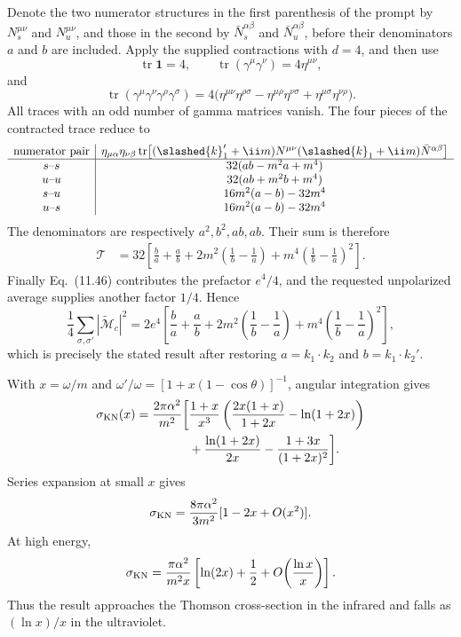 \begin{enumerate}
Denote the two numerator structures in the first parenthesis of the prompt
by \(N_s^{\mu\nu}\) and \(N_u^{\mu\nu}\), and those in the second by
\(\bar N_s^{\alpha\beta}\) and \(\bar N_u^{\alpha\beta}\), before their
denominators \(a\) and \(b\) are included.  Apply the supplied contractions
with \(d=4\), and then use
\[
 \operatorname{tr}\mathbf1=4,
 \qquad
 \operatorname{tr}(\gamma^\mu\gamma^\nu)=4\eta^{\mu\nu},
\]
and
\[
 \operatorname{tr}(\gamma^\mu\gamma^\nu\gamma^\rho\gamma^\sigma)
 =4\bigl(\eta^{\mu\nu}\eta^{\rho\sigma}
 -\eta^{\mu\rho}\eta^{\nu\sigma}
 +\eta^{\mu\sigma}\eta^{\nu\rho}\bigr).
\]
All traces with an odd number of gamma matrices vanish.  The four pieces of
the contracted trace reduce to
\[
 \begin{array}{c|c}
 \text{numerator pair}&
 \eta_{\mu\alpha}\eta_{\nu\beta}
 \operatorname{tr}\bigl[(\slashed{k}_1'+\ii m)
 N^{\mu\nu}(\slashed{k}_1+\ii m)\bar N^{\alpha\beta}\bigr]\\ \hline
 s\text{--}s&32(ab-m^2a+m^4)\\
 u\text{--}u&32(ab+m^2b+m^4)\\
 s\text{--}u&16m^2(a-b)-32m^4\\
 u\text{--}s&16m^2(a-b)-32m^4
 \end{array}
\]
The denominators are respectively \(a^2,b^2,ab,ab\).  Their sum is therefore
\[
 \begin{split}
 \mathcal T
 &=32\left[
 \frac ba+\frac ab
 +2m^2\left(\frac1b-\frac1a\right)
 +m^4\left(\frac1b-\frac1a\right)^2
 \right].
 \end{split}
\]
Finally Eq.~(11.46) contributes the prefactor \(e^4/4\), and the requested
unpolarized average supplies another factor \(1/4\).  Hence
\[
 \boxed{
 \frac14\sum_{\sigma,\sigma'}|\widetilde{\mathcal M}_{c}|^2
 =2e^4\left[
 \frac ba+\frac ab
 +2m^2\left(\frac1b-\frac1a\right)
 +m^4\left(\frac1b-\frac1a\right)^2
 \right],}
\]
which is precisely the stated result after restoring
\(a=k_1\cdot k_2\) and \(b=k_1\cdot k_2'\).

With \(x=\omega/m\) and
\(\omega'/\omega=[1+x(1-\cos\theta)]^{-1}\), angular integration gives
\[
 \begin{split}
 \sigma_{\rm KN}(x)=\frac{2\pi\alpha^2}{m^2}\biggl[
 &\frac{1+x}{x^3}
 \left(\frac{2x(1+x)}{1+2x}-\ln(1+2x)\right)\\
 &+\frac{\ln(1+2x)}{2x}
 -\frac{1+3x}{(1+2x)^2}
 \biggr].
 \end{split}
\]
Series expansion at small \(x\) gives
\[
 \sigma_{\rm KN}=\frac{8\pi\alpha^2}{3m^2}
 [1-2x+O(x^2)].
\]
At high energy,
\[
 \sigma_{\rm KN}
 =\frac{\pi\alpha^2}{m^2x}
 \left[\ln(2x)+\frac12+O\!\left(\frac{\ln x}{x}\right)\right].
\]
Thus the result approaches the Thomson cross-section in the infrared and
falls as \((\ln x)/x\) in the ultraviolet.


\end{enumerate}
